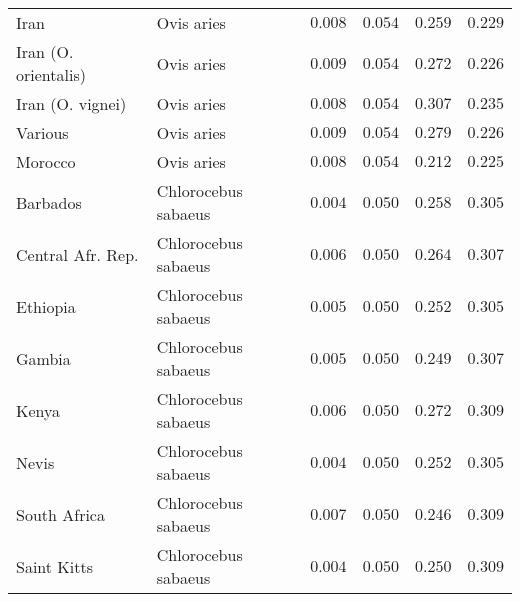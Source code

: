 \documentclass{article}
\begin{document}
\begin{center}
\begin{longtable}{|l|l|r|r|r|r|}
            Iran                 & Ovis aries          & $ 0.008$              & $ 0.054$                & $ 0.259$                 & $ 0.229$                \\
            Iran (O. orientalis) & Ovis aries          & $ 0.009$              & $ 0.054$                & $ 0.272$                 & $ 0.226$                \\
            Iran (O. vignei)     & Ovis aries          & $ 0.008$              & $ 0.054$                & $ 0.307$                 & $ 0.235$                \\
            Various              & Ovis aries          & $ 0.009$              & $ 0.054$                & $ 0.279$                 & $ 0.226$                \\
            Morocco              & Ovis aries          & $ 0.008$              & $ 0.054$                & $ 0.212$                 & $ 0.225$                \\
            Barbados             & Chlorocebus sabaeus & $ 0.004$              & $ 0.050$                & $ 0.258$                 & $ 0.305$                \\
            Central Afr. Rep.    & Chlorocebus sabaeus & $ 0.006$              & $ 0.050$                & $ 0.264$                 & $ 0.307$                \\
            Ethiopia             & Chlorocebus sabaeus & $ 0.005$              & $ 0.050$                & $ 0.252$                 & $ 0.305$                \\
            Gambia               & Chlorocebus sabaeus & $ 0.005$              & $ 0.050$                & $ 0.249$                 & $ 0.307$                \\
            Kenya                & Chlorocebus sabaeus & $ 0.006$              & $ 0.050$                & $ 0.272$                 & $ 0.309$                \\
            Nevis                & Chlorocebus sabaeus & $ 0.004$              & $ 0.050$                & $ 0.252$                 & $ 0.305$                \\
            South Africa         & Chlorocebus sabaeus & $ 0.007$              & $ 0.050$                & $ 0.246$                 & $ 0.309$                \\
            Saint Kitts          & Chlorocebus sabaeus & $ 0.004$              & $ 0.050$                & $ 0.250$                 & $ 0.309$                \\

\end{longtable}
\end{center}
\end{document}
